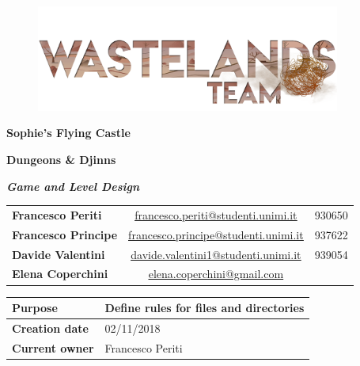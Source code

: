 \documentclass[12pt]{article}
\begin{document}
\begin{center}
  \begin{figure}[H]
  \centering
  \vspace*{5\baselineskip}
  \includegraphics[width=10cm]{../Logos/logoTeam}
  \end{figure}

  \vspace{50pt}
  
  \huge \textbf{Sophie's Flying Castle}
  
  \large \textbf{Dungeons \& Djinns}
  
  \vspace{20pt}
  
  \large \textbf{\textit{Game and Level Design}}
  
\end{center}

\vspace{20pt}
\begin{table}[H]
  \centering
  \begin{tabular}{lcr}
    \textbf{Francesco Periti}	& \underline{\href{mailto:francesco.periti@studenti.unimi.it}{francesco.periti@studenti.unimi.it}}	& 930650 \\
    \textbf{Francesco Principe}	& \underline{\href{mailto:francesco.principe@studenti.unimi.it}{francesco.principe@studenti.unimi.it}}	& 937622 \\
    \textbf{Davide Valentini}	& \underline{\href{mailto:davide.valentini1@studenti.unimi.it}{davide.valentini1@studenti.unimi.it}}	& 939054 \\
    \textbf{Elena Coperchini}	& \underline{\href{mailto:elena.coperchini@gmail.com}{elena.coperchini@gmail.com}}			& \\
  \end{tabular}
\end{table}


  \vspace{10pt}

\begin{table}[H]
  \centering
  \begin{tabular}{|l|l|}
    \hline
    \cellcolor{lightgray}\textbf{Purpose} &  Define rules for files and directories \\\hline
    \cellcolor{lightgray}\textbf{Creation date} & 02/11/2018 \\\hline
    \cellcolor{lightgray}\textbf{Current owner} & Francesco Periti \\\hline
  \end{tabular}
\end{table}
\end{document}
